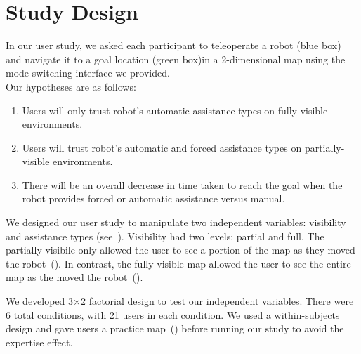 \section{Study Design}
\label{sec:approach}

In our user study, we asked each participant to teleoperate a robot (blue box) and navigate it to a goal location (green box)in a 2-dimensional map using the mode-switching interface we provided.\\

Our hypotheses are as follows:
\begin{enumerate}
    \item [] \begin{hypothesis} Users will only trust robot’s automatic assistance types on fully-visible environments.\label{hyp:h1} \end{hypothesis}
    \item [] \begin{hypothesis} Users will trust robot’s automatic and forced assistance types on partially-visible environments.\label{hyp:h2} \end{hypothesis}
    \item [] \begin{hypothesis} There will be an overall decrease in time taken to reach the goal when the robot provides forced or automatic assistance versus manual.\label{hyp:h3} \end{hypothesis}
\end{enumerate}

We designed our user study to manipulate two independent variables: visibility and assistance types (see~). Visibility had two levels: partial and full. The partially visibile only allowed the user to see a portion of the map as they moved the robot~(). In contrast, the fully visible map allowed the user to see the entire map as the moved the robot~(). 

We developed 3$\times$2 factorial design to test our independent variables. There were 6 total conditions, with 21 users in each condition. We used a within-subjects design and gave users a practice map~() before running our study to avoid the expertise effect.
